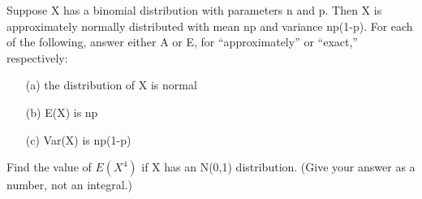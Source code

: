 \oneproblem
Suppose X has a binomial distribution with parameters n and
p.  Then X is approximately normally distributed with mean np and
variance np(1-p).  For each of the following, answer either A or E, for
``approximately'' or ``exact,'' respectively:

\begin{itemize}

\item [(a)] the distribution of X is normal

\item [(b)] E(X) is np

\item [(c)] Var(X) is np(1-p)

\end{itemize}

\oneproblem
Find the value of $E(X^4)$ if X has an N(0,1) distribution.  (Give your
answer as a number, not an integral.)

